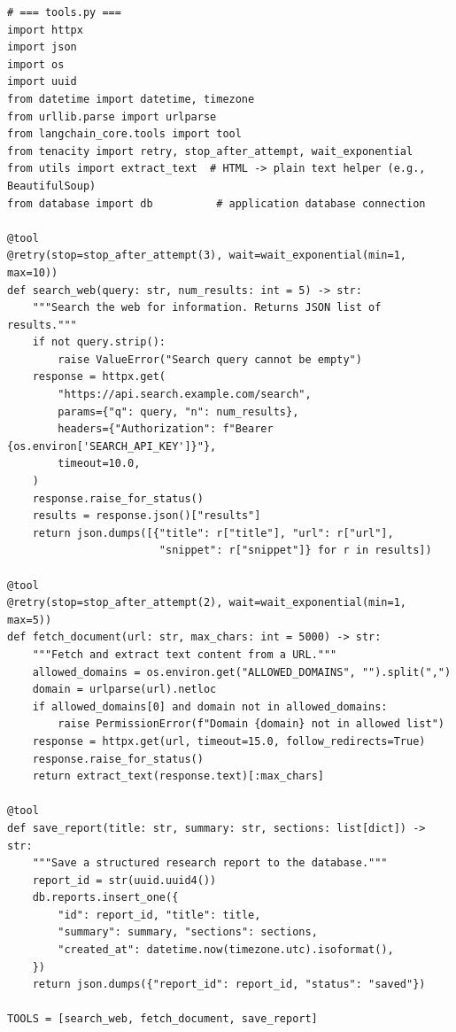 \begin{lstlisting}[style=pythonstyle, caption={Complete production research agent: tools and state}]
# === tools.py ===
import httpx
import json
import os
import uuid
from datetime import datetime, timezone
from urllib.parse import urlparse
from langchain_core.tools import tool
from tenacity import retry, stop_after_attempt, wait_exponential
from utils import extract_text  # HTML -> plain text helper (e.g., BeautifulSoup)
from database import db          # application database connection

@tool
@retry(stop=stop_after_attempt(3), wait=wait_exponential(min=1, max=10))
def search_web(query: str, num_results: int = 5) -> str:
    """Search the web for information. Returns JSON list of results."""
    if not query.strip():
        raise ValueError("Search query cannot be empty")
    response = httpx.get(
        "https://api.search.example.com/search",
        params={"q": query, "n": num_results},
        headers={"Authorization": f"Bearer {os.environ['SEARCH_API_KEY']}"},
        timeout=10.0,
    )
    response.raise_for_status()
    results = response.json()["results"]
    return json.dumps([{"title": r["title"], "url": r["url"],
                        "snippet": r["snippet"]} for r in results])

@tool
@retry(stop=stop_after_attempt(2), wait=wait_exponential(min=1, max=5))
def fetch_document(url: str, max_chars: int = 5000) -> str:
    """Fetch and extract text content from a URL."""
    allowed_domains = os.environ.get("ALLOWED_DOMAINS", "").split(",")
    domain = urlparse(url).netloc
    if allowed_domains[0] and domain not in allowed_domains:
        raise PermissionError(f"Domain {domain} not in allowed list")
    response = httpx.get(url, timeout=15.0, follow_redirects=True)
    response.raise_for_status()
    return extract_text(response.text)[:max_chars]

@tool
def save_report(title: str, summary: str, sections: list[dict]) -> str:
    """Save a structured research report to the database."""
    report_id = str(uuid.uuid4())
    db.reports.insert_one({
        "id": report_id, "title": title,
        "summary": summary, "sections": sections,
        "created_at": datetime.now(timezone.utc).isoformat(),
    })
    return json.dumps({"report_id": report_id, "status": "saved"})

TOOLS = [search_web, fetch_document, save_report]
\end{lstlisting}

